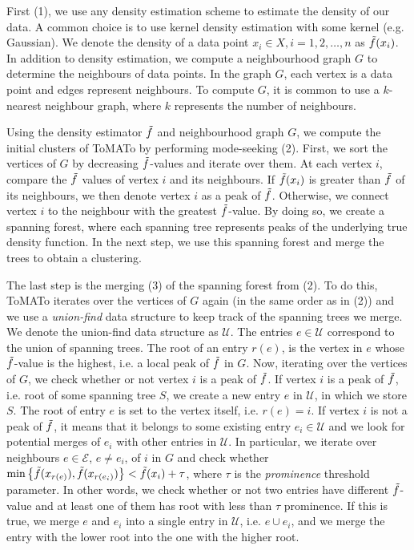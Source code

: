 First (1), we use any density estimation scheme to estimate the density of our data. A common choice is to use kernel density estimation with some kernel (e.g. Gaussian). We denote the density of a data point $x_i \in X, i = 1, 2, \ldots, n$ as $\Tilde{f}(x_i)$. In addition to density estimation, we compute a neighbourhood graph $G$ to determine the neighbours of data points. In the graph $G$, each vertex is a data point and edges represent neighbours. To compute $G$, it is common to use a $k$-nearest neighbour graph, where $k$ represents the number of neighbours.

Using the density estimator $\Tilde{f}$ and neighbourhood graph $G$, we compute the initial clusters of ToMATo by performing mode-seeking (2). First, we sort the vertices of $G$ by decreasing $\Tilde{f}$-values and iterate over them. At each vertex $i$, compare the $\Tilde{f}$ values of vertex $i$ and its neighbours. If $\Tilde{f}(x_i)$ is greater than $\Tilde{f}$ of its neighbours, we then denote vertex $i$ as a peak of $\Tilde{f}$. Otherwise, we connect vertex $i$ to the neighbour with the greatest $\Tilde{f}$-value. By doing so, we create a spanning forest, where each spanning tree represents peaks of the underlying true density function. In the next step, we use this spanning forest and merge the trees to obtain a clustering.

The last step is the merging (3) of the spanning forest from (2). To do this, ToMATo iterates over the vertices of $G$ again (in the same order as in (2)) and we use a \textit{union-find} data structure to keep track of the spanning trees we merge. We denote the union-find data structure as $\mathcal{U}$. The entries $e \in \mathcal{U}$ correspond to the union of spanning trees. The root of an entry $r(e)$, is the vertex in $e$ whose $\Tilde{f}$-value is the highest, i.e. a local peak of $\Tilde{f}$ in $G$. Now, iterating over the vertices of $G$, we check whether or not vertex $i$ is a peak of $\Tilde{f}$. If vertex $i$ is a peak of $\Tilde{f}$, i.e. root of some spanning tree $S$, we create a new entry $e$ in $\mathcal{U}$, in which we store $S$. The root of entry $e$ is set to the vertex itself, i.e. $r(e) = i$. If vertex $i$ is not a peak of $\Tilde{f}$, it means that it belongs to some existing entry $e_i \in \mathcal{U}$ and we look for potential merges of $e_i$ with other entries in $\mathcal{U}$. In particular, we iterate over neighbours $e \in \mathcal{E}$, $e \neq e_i$, of $i$ in $G$ and check whether $\min \left\{ \Tilde{f}(x_{r(e)}), \Tilde{f}(x_{r(e_i)}) \right\} < \Tilde{f}(x_i) + \tau$, where $\tau$ is the \textit{prominence} threshold parameter. In other words, we check whether or not two entries have different $\Tilde{f}$-value and at least one of them has root with less than $\tau$ prominence. If this is true, we merge $e$ and $e_i$ into a single entry in $\mathcal{U}$, i.e. $e \cup e_i$, and we merge the entry with the lower root into the one with the higher root.

